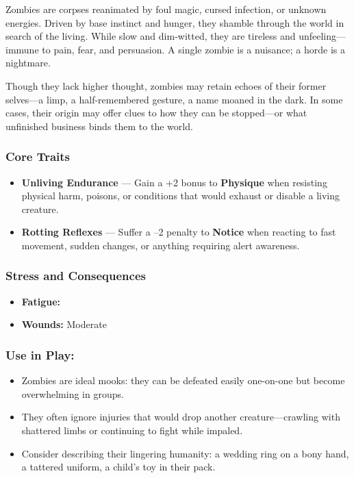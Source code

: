 Zombies are corpses reanimated by foul magic, cursed infection, or unknown energies. Driven by base instinct and hunger, they shamble through the world in search of the living. While slow and dim-witted, they are tireless and unfeeling—immune to pain, fear, and persuasion. A single zombie is a nuisance; a horde is a nightmare.

Though they lack higher thought, zombies may retain echoes of their former selves—a limp, a half-remembered gesture, a name moaned in the dark. In some cases, their origin may offer clues to how they can be stopped—or what unfinished business binds them to the world.

\subsubsection*{Core Traits}
\begin{itemize}
  \item \textbf{Unliving Endurance} — Gain a +2 bonus to \textbf{Physique} when resisting physical harm, poisons, or conditions that would exhaust or disable a living creature.

  \item \textbf{Rotting Reflexes} — Suffer a –2 penalty to \textbf{Notice} when reacting to fast movement, sudden changes, or anything requiring alert awareness.
\end{itemize}

\subsubsection*{Stress and Consequences}
\begin{itemize}
  \item \textbf{Fatigue:} \FatigueBox \FatigueBox \FatigueBox \FatigueBox
  \item \textbf{Wounds:} Moderate \ModerateWound
\end{itemize}

\subsubsection*{Use in Play:}
\begin{itemize}
  \item Zombies are ideal mooks: they can be defeated easily one-on-one but become overwhelming in groups.
  \item They often ignore injuries that would drop another creature—crawling with shattered limbs or continuing to fight while impaled.
  \item Consider describing their lingering humanity: a wedding ring on a bony hand, a tattered uniform, a child's toy in their pack.
\end{itemize}

